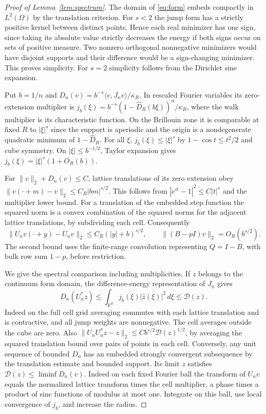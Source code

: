 \documentclass[11pt]{article}
\numberwithin{equation}{section}
\begin{document}
\begin{proof}[Proof of Lemma~\ref{lem:spectrum}]
The domain of \eqref{eq:form} embeds compactly in \(L^2(\Omega)\) by
the translation criterion. For \(s<2\) the jump form has a
strictly positive kernel between distinct points. Hence each real
minimizer has one sign, since taking its absolute value strictly
decreases the energy if both signs occur on sets of positive measure.
Two nonzero orthogonal nonnegative minimizers would have disjoint
supports and their difference would be a sign-changing minimizer.
This proves simplicity. For \(s=2\) simplicity follows from the
Dirichlet sine expansion.

Put \(b=1/n\) and
\(D_n(v)=b^{-s}\langle v,J_n v\rangle/\kappa_R\).
In rescaled Fourier variables its zero-extension multiplier is
\(j_b(\xi)=b^{-s}(1-\widehat D_R(b\xi))^\alpha/\kappa_R\),
where the walk multiplier is its characteristic function. On the
Brillouin zone it is comparable at fixed \(R\) to \(|\xi|^s\)
since the support is aperiodic and the origin is a nondegenerate quadratic
minimum of \(1-\widehat D_R\). For all \(\xi\),
\(j_b(\xi)\le |\xi|^s\) by \(1-\cos t\le t^2/2\) and cube symmetry.
On \(|\xi|\le b^{-1/2}\), Taylor expansion gives
\(j_b(\xi)=|\xi|^s(1+O_R(b))\).

For \(\|v\|_2+D_n(v)\le C\), lattice translations of its zero
extension obey
\(\|v(\cdot+m)-v\|_2\le C_R|bm|^{s/2}\). This follows from
\(|e^{it}-1|^2\le C|t|^s\) and the multiplier lower bound.
For a translation of the embedded step function the squared norm is
a convex combination of the squared norms for the adjacent lattice
translations, by subdividing each cell. Consequently
\begin{equation}
 \|U_n v(\cdot+y)-U_n v\|_2\le C_R(|y|+b)^{s/2},\qquad
 \|(B-pI)v\|_2=O_R(b^{s/2}).
\end{equation}
The second bound uses the finite-range convolution representing
\(Q=I-B\), with bulk row sum \(1-p\), before restriction.

We give the spectral comparison including multiplicities. If \(z\)
belongs to the continuum form domain, the difference-energy
representation of \(J_n\) gives
\begin{equation}
 D_n(U_n^*z)\le\int_{\mathbb R^d}j_b(\xi)|\widehat z(\xi)|^2\,d\xi
 \le \mathcal D(z).
\end{equation}
Indeed on the full cell grid averaging commutes with each lattice
translation and is contractive, and all jump weights are nonnegative.
The cell averages outside the cube are zero. Also
\(\|U_nU_n^*z-z\|_2\le C b^{s/2}\mathcal D(z)^{1/2}\), by averaging
the squared translation bound over pairs of points in each cell.
Conversely, any unit sequence of bounded \(D_n\) has an embedded
strongly convergent subsequence by the translation estimate and
bounded support. Its limit \(z\) satisfies
\(\mathcal D(z)\le\liminf D_n(v)\). Indeed on each fixed Fourier
ball the transform of \(U_n v\) equals the normalized lattice
transform times the cell multiplier, a phase times a product of
sinc functions of modulus at most one. Integrate on this ball,
use local convergence of \(j_b\), and increase the radius.


\end{proof}
\end{document}
